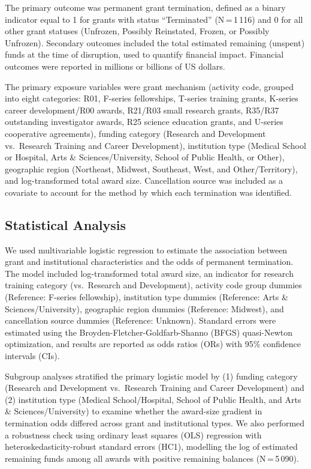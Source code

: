 \documentclass[10pt, letterpaper]{article}
\begin{document}
The primary outcome was permanent grant termination, defined as a binary indicator equal to 1 for grants with status ``Terminated'' (N\,=\,1\,116) and 0 for all other grant statuses (Unfrozen, Possibly Reinstated, Frozen, or Possibly Unfrozen). Secondary outcomes included the total estimated remaining (unspent) funds at the time of disruption, used to quantify financial impact. Financial outcomes were reported in millions or billions of US dollars.

The primary exposure variables were grant mechanism (activity code, grouped into eight categories: R01, F-series fellowships, T-series training grants, K-series career development/R00 awards, R21/R03 small research grants, R35/R37 outstanding investigator awards, R25 science education grants, and U-series cooperative agreements), funding category (Research and Development vs.\ Research Training and Career Development), institution type (Medical School or Hospital, Arts \& Sciences/University, School of Public Health, or Other), geographic region (Northeast, Midwest, Southeast, West, and Other/Territory), and log-transformed total award size. Cancellation source was included as a covariate to account for the method by which each termination was identified.

\subsection*{Statistical Analysis}

We used multivariable logistic regression to estimate the association between grant and institutional characteristics and the odds of permanent termination.\cite{hosmer2013applied} The model included log-transformed total award size, an indicator for research training category (vs.\ Research and Development), activity code group dummies (Reference: F-series fellowship), institution type dummies (Reference: Arts \& Sciences/University), geographic region dummies (Reference: Midwest), and cancellation source dummies (Reference: Unknown). Standard errors were estimated using the Broyden-Fletcher-Goldfarb-Shanno (BFGS) quasi-Newton optimization, and results are reported as odds ratios (ORs) with 95\% confidence intervals (CIs).

Subgroup analyses stratified the primary logistic model by (1) funding category (Research and Development vs.\ Research Training and Career Development) and (2) institution type (Medical School/Hospital, School of Public Health, and Arts \& Sciences/University) to examine whether the award-size gradient in termination odds differed across grant and institutional types. We also performed a robustness check using ordinary least squares (OLS) regression with heteroskedasticity-robust standard errors (HC1), modelling the log of estimated remaining funds among all awards with positive remaining balances (N\,=\,5\,090).
\end{document}
